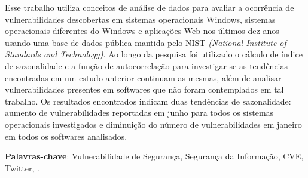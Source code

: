 \documentclass[12pt,
openright, 
oneside, %
a4paper,    %
brazil]{facom-ufu-abntex2}
\begin{document}
	
%
\begin{resumo} %
Esse trabalho utiliza conceitos de análise de dados para avaliar a ocorrência de vulnerabilidades descobertas em sistemas operacionais Windows, sistemas operacionais diferentes do Windows e aplicações Web nos últimos dez anos usando uma base de dados pública mantida pelo NIST \textit{(National Institute of Standards and Technology)}. Ao longo da pesquisa foi utilizado o cálculo de índice de sazonalidade e a função de autocorrelação para investigar se as tendências encontradas em um estudo anterior continuam as mesmas, além de analisar vulnerabilidades presentes em softwares que não foram contemplados em tal trabalho. Os resultados encontrados indicam duas tendências de sazonalidade: aumento de vulnerabilidades reportadas em junho para todos os sistemas operacionais investigados e diminuição do número de vulnerabilidades em janeiro em todos os softwares analisados.


 
  \vspace{\onelineskip}
  \noindent
  \textbf{Palavras-chave}: Vulnerabilidade de Segurança, Segurança da Informação, CVE, Twitter, . %
 \end{resumo}

\listailustracoes

\listatabelas




\sumario


\textual




\end{document}
